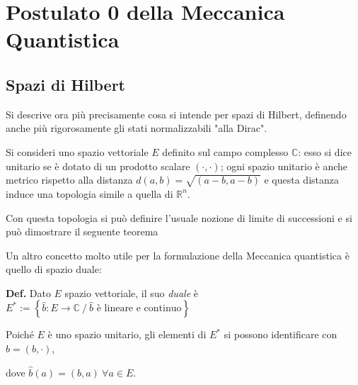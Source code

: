 \section{Postulato 0 della Meccanica Quantistica}

\noindent{}
\subsection{Spazi di Hilbert}
Si descrive ora più precisamente cosa si intende per spazi di Hilbert, definendo anche
più rigorosamente gli stati normalizzabili "alla Dirac".

Si consideri uno spazio vettoriale $ E $ definito sul campo complesso $ \mathbb{C} $:
esso si dice unitario se è dotato di un prodotto scalare $(\cdot,\cdot)$; ogni spazio
unitario è anche metrico rispetto alla distanza $ d(a,b) = \sqrt{(a-b,a-b)} $ e questa
distanza induce una topologia simile a quella di $ \mathbb{R}^n $.

Con questa topologia si può definire l'usuale nozione di limite di successioni e si 
può dimostrare il seguente teorema

\noindent{}

\newpage
Un altro concetto molto utile per la formulazione della Meccanica quantistica è quello di
spazio duale:

\textbf{Def.} Dato $ E $ spazio vettoriale, il suo \textit{duale }è
$ E^* := \left\{ \hat{b}: E\to\mathbb{C}\: /\: \hat{b} \text{ è lineare e continuo} \right\} $

Poiché $ E $ è uno spazio unitario, gli elementi di $ E^* $ si possono identificare con
$ \hat{b} = (b,\cdot) $,

dove $ \hat{b}(a) = (b,a)\: \forall a\in E $.

